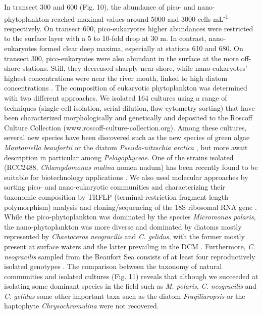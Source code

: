 \documentclass[essd, manuscript]{copernicus}
\begin{document}
In transect 300 and 600 (Fig. 10), the abundance of pico- and nano-phytoplankton reached maximal values around 5000 and 3000 cells mL\textsuperscript{-1} respectively.  On transect 600, pico-eukaryotes higher abundances were restricted to the surface layer with a 5 to 10-fold drop at 30 m.  In contrast, nano-eukaryotes formed clear deep maxima, especially at stations 610 and 680.  On transect 300, pico-eukaryotes were also abundant in the surface at the more off-shore stations. Still, they decreased sharply near-shore, while nano-eukaryotes' highest concentrations were near the river mouth, linked to high diatom concentrations \citep{Balzano2012}.  The composition of eukaryotic phytoplankton was determined with two different approaches.  We isolated 164 cultures using a range of techniques (single-cell isolation, serial dilution, flow cytometry sorting) that have been characterized morphologically and genetically \citep{Balzano2012, Balzano2017} and deposited to the Roscoff Culture Collection (www.roscoff-culture-collection.org).  Among these cultures, several new species have been discovered such as the new species of green algae \textit{Mantoniella beaufortii} \citep{Yau2020} or the diatom \textit{Pseudo-nitzschia arctica} \citep{Percopo2016}, but more await description in particular among \textit{Pelagophyceae}.  One of the strains isolated (RCC2488, \textit{Chlamydomonas malina} nomen nudum) has been recently found to be suitable for biotechnology applications \citep{Morales-Sanchez2020}. We also used molecular approaches by sorting pico- and nano-eukaryotic communities and characterizing their taxonomic composition by TRFLP (terminal-restriction fragment length polymorphism) analysis and cloning/sequencing of the 18S ribosomal RNA gene \citep{Balzano2012}.  While the pico-phytoplankton was dominated by the species \textit{Micromonas polaris}, the nano-phytoplankton was more diverse and dominated by diatoms mostly represented by \textit{Chaetoceros neogracilis} and \textit{C. gelidus}, with the former mostly present at surface waters and the latter prevailing in the DCM \citep{Balzano2012}. Furthermore, \textit{C. neogracilis} sampled from the Beaufort Sea consists of at least four reproductively isolated genotypes \citep{Balzano2017}.  The comparison between the taxonomy of natural communities and isolated cultures (Fig. 11) reveals that although we succeeded at isolating some dominant species in the field such as \textit{M. polaris}, \textit{C. neogracilis} and \textit{C. gelidus} some other important taxa such as the diatom \textit{Fragiliaropsis} or the haptophyte \textit{Chrysochromulina} were not recovered.
\end{document}
